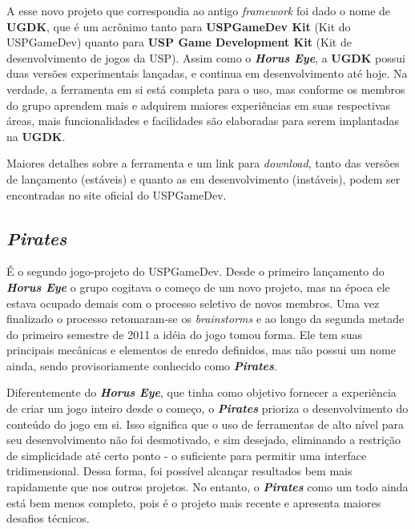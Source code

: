 \documentclass[12pt,onecolumn,a4paper]{article}
\begin{document}
        A esse novo projeto que correspondia ao antigo \textit{framework} foi dado o nome de
        \textbf{UGDK}, que é um acrônimo tanto para \textbf{USPGameDev Kit} (Kit do USPGameDev)
        quanto para \textbf{USP Game Development Kit} (Kit de desenvolvimento de jogos da USP).
        Assim como o \textit{\textbf{Horus Eye}}, a \textbf{UGDK} possui duas versões experimentais
        lançadas, e continua em desenvolvimento até hoje. Na verdade, a ferramenta em si está
        completa para o uso, mas conforme os membros do grupo aprendem mais e adquirem maiores
        experiências em suas respectivas áreas, mais funcionalidades e facilidades são elaboradas
        para serem implantadas na \textbf{UGDK}.
        
        Maiores detalhes sobre a ferramenta e um link para \textit{download}, tanto das versões de
        lançamento (estáveis) e quanto as em desenvolvimento (instáveis), podem ser encontradas no
        site oficial do USPGameDev.
    
    \subsection{\textit{Pirates}}
    \label{sec:pirates}
        É o segundo jogo-projeto do USPGameDev. Desde o primeiro lançamento do
        \textit{\textbf{Horus Eye}} o grupo cogitava o começo de um novo projeto, mas na época ele
        estava ocupado demais com o processo seletivo de novos membros. Uma vez finalizado o
        processo retomaram-se os \textit{brainstorms} e ao longo da segunda metade do primeiro
        semestre de 2011 a idéia do jogo tomou forma. Ele tem suas principais mecânicas e elementos
        de enredo definidos, mas não possui um nome ainda, sendo provisoriamente conhecido como
        \textit{\textbf{Pirates}}.
        
        Diferentemente do \textit{\textbf{Horus Eye}}, que tinha como objetivo fornecer a
        experiência de criar um jogo inteiro desde o começo, o \textit{\textbf{Pirates}} prioriza
        o desenvolvimento do conteúdo do jogo em si. Isso significa que o uso de ferramentas de alto
        nível para seu desenvolvimento não foi desmotivado, e sim desejado, eliminando a restrição
        de simplicidade até certo ponto - o suficiente para permitir uma interface tridimensional.
        Dessa forma, foi possível alcançar resultados bem mais rapidamente que nos outros projetos.
        No entanto, o \textit{\textbf{Pirates}} como um todo ainda está bem menos completo, pois é o
        projeto mais recente e apresenta maiores desafios técnicos.
        
\end{document}
